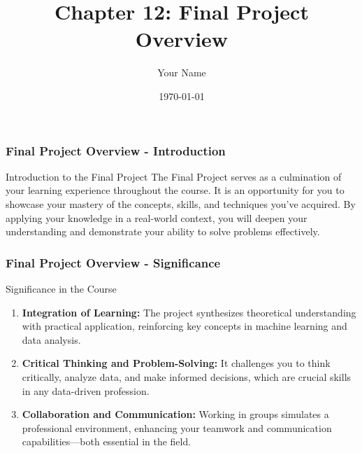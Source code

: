 \documentclass{beamer}
\title{Chapter 12: Final Project Overview}
\author{Your Name}
\institute{Your Institution}
\date{\today}
\begin{document}
\frame{\titlepage}

\begin{frame}[fragile]
    \frametitle{Final Project Overview - Introduction}
    \begin{block}{Introduction to the Final Project}
        The Final Project serves as a culmination of your learning experience throughout the course. 
        It is an opportunity for you to showcase your mastery of the concepts, skills, and techniques 
        you've acquired. By applying your knowledge in a real-world context, you will deepen your 
        understanding and demonstrate your ability to solve problems effectively.
    \end{block}
\end{frame}

\begin{frame}[fragile]
    \frametitle{Final Project Overview - Significance}
    \begin{block}{Significance in the Course}
        \begin{enumerate}
            \item \textbf{Integration of Learning:} 
            The project synthesizes theoretical understanding with practical application, 
            reinforcing key concepts in machine learning and data analysis.
            
            \item \textbf{Critical Thinking and Problem-Solving:} 
            It challenges you to think critically, analyze data, and make informed decisions, 
            which are crucial skills in any data-driven profession.
            
            \item \textbf{Collaboration and Communication:} 
            Working in groups simulates a professional environment, enhancing your teamwork 
            and communication capabilities—both essential in the field.
        \end{enumerate}
    \end{block}
\end{frame}
\end{document}
